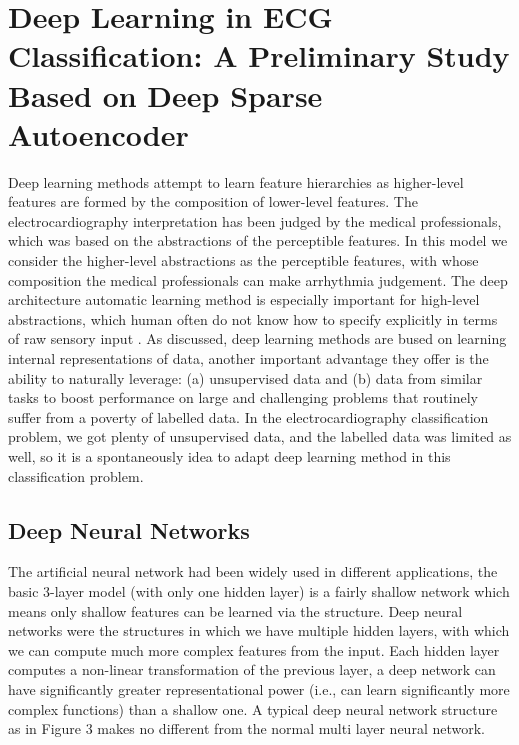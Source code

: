 \documentclass[graybox]{svmult}
\begin{document}
\section{Deep Learning in ECG Classification: A Preliminary Study Based on Deep Sparse Autoencoder}
Deep learning methods attempt to learn feature hierarchies as higher-level features are formed by the composition of lower-level features. The electrocardiography interpretation has been judged by the medical professionals, which was based on the abstractions of the perceptible features. In this model we consider the higher-level abstractions as the perceptible features, with whose composition the medical professionals can make arrhythmia judgement. The deep architecture automatic learning method is especially important for high-level abstractions, which human often do not know how to specify explicitly in terms of raw sensory input \cite{erhan}. As \cite{collobert} discussed, deep learning methods are bused on learning internal representations of data, another important advantage they offer is the ability to naturally leverage: (a) unsupervised data and (b) data from similar tasks to boost performance on large and challenging problems that routinely suffer from a poverty of labelled data. In the electrocardiography classification problem, we got plenty of unsupervised data, and the labelled data was limited as well, so it is a spontaneously idea to adapt deep learning method in this classification problem. 

\subsection{Deep Neural Networks}
The artificial neural network had been widely used in different applications, the basic 3-layer model (with only one hidden layer) is a fairly shallow network which means only shallow features can be learned via the structure. Deep neural networks were the structures in which we have multiple hidden layers, with which we can compute much more complex features from the input. Each hidden layer computes a non-linear transformation of the previous layer, a deep network can have significantly greater representational power (i.e., can learn significantly more complex functions) than a shallow one. A typical deep neural network structure as in Figure 3 makes no different from the normal multi layer neural network.
\end{document}
